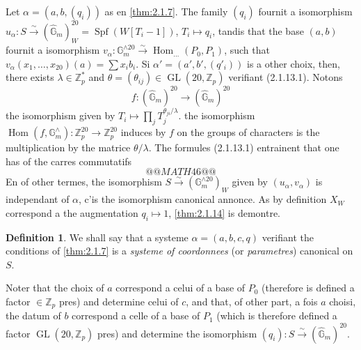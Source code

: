 \documentclass[12pt,a4paper]{article}
\theoremstyle{plain}
\theoremstyle{definition}
\newtheorem{definition}[theorem]{Definition}
\theoremstyle{remark}
\DeclareMathOperator{\Hom}{Hom}
\DeclareMathOperator{\Spf}{Spf}
\providecommand{\Hom}{\operatorname{Hom}}
\providecommand{\GL}{\operatorname{GL}}
\begin{document}
Let $\alpha = (a, b, (q_i))$ as en \ref{thm:2.1.7}. The family $(q_i)$ fournit a isomorphism $u_\alpha : S \xrightarrow{\sim} (\hat{\mathbb{G}}_m)^{20}_W = \Spf(W[T_i - 1])$, $T_i \mapsto q_i$, tandis that the base $(a, b)$ fournit a isomorphism $v_\alpha : \mathbb{G}_m^{\wedge 20} \xrightarrow{\sim} \Hom_{\ldots}(P_0, P_1)$, such that $v_\alpha(x_1, \ldots, x_{20})(a) = \sum x_i b_i$. Si $\alpha' = (a', b', (q'_i))$ is a other choix, then, there exists $\lambda \in \mathbb{Z}_p^*$ and $\theta = (\theta_{ij}) \in \GL(20, \mathbb{Z}_p)$ verifiant (2.1.13.1). Notons
\[
f : (\hat{\mathbb{G}}_m)^{20} \longrightarrow (\hat{\mathbb{G}}_m)^{20}
\]
the isomorphism given by $T_i \mapsto \prod_j T_j^{\theta_{ji}/\lambda}$. the isomorphism $\Hom(f, \mathbb{G}_m^{\wedge}) : \mathbb{Z}_p^{20} \to \mathbb{Z}_p^{20}$ induces by $f$ on the groups of characters is the multiplication by the matrice $\theta/\lambda$. The formules (2.1.13.1) entrainent that one has of the carres commutatifs
\[
@@MATH46@@
\]
En of other termes, the isomorphism $S \xrightarrow{\sim} (\mathbb{G}_m^{\wedge 20})_W$ given by $(u_\alpha, v_\alpha)$ is independant of $\alpha$, c'is the isomorphism canonical annonce. As by definition $X_W$ correspond a the augmentation $q_i \mapsto 1$, \ref{thm:2.1.14} is demontre.

\begin{definition}\label{def:2.1.15}
We shall say that a systeme $\alpha = (a, b, c, q)$ verifiant the conditions of \ref{thm:2.1.7} is a \emph{systeme of coordonnees} (or \emph{parametres}) canonical on $S$.
\end{definition}

Noter that the choix of $a$ correspond a celui of a base of $P_0$ (therefore is defined a factor $\in \mathbb{Z}_p$ pres) and determine celui of $c$, and that, of other part, a fois $a$ choisi, the datum of $b$ correspond a celle of a base of $P_1$ (which is therefore defined a factor $\GL(20, \mathbb{Z}_p)$ pres) and determine the isomorphism $(q_i) : S \xrightarrow{\sim} (\hat{\mathbb{G}}_m)^{20}$.
\end{document}
